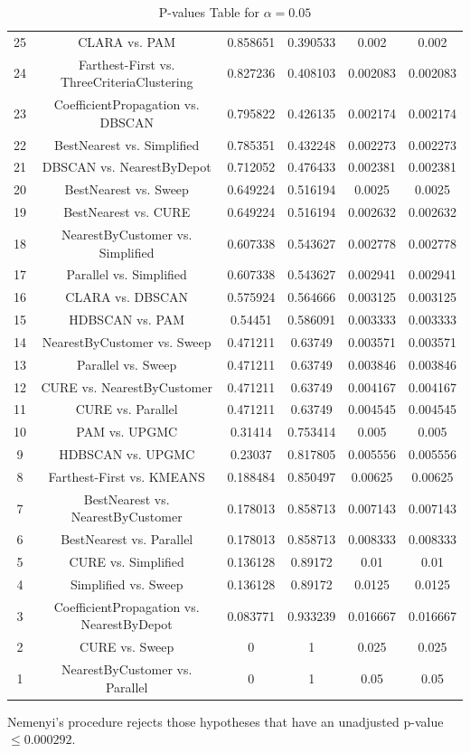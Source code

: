 \documentclass[a4paper,10pt]{article}
\begin{document}
\begin{landscape}
\begin{table}[!htp]
\begin{tabular}{cccccc}
25&CLARA vs. PAM&0.858651&0.390533&0.002&0.002\\
24&Farthest-First vs. ThreeCriteriaClustering&0.827236&0.408103&0.002083&0.002083\\
23&CoefficientPropagation vs. DBSCAN&0.795822&0.426135&0.002174&0.002174\\
22&BestNearest vs. Simplified&0.785351&0.432248&0.002273&0.002273\\
21&DBSCAN vs. NearestByDepot&0.712052&0.476433&0.002381&0.002381\\
20&BestNearest vs. Sweep&0.649224&0.516194&0.0025&0.0025\\
19&BestNearest vs. CURE&0.649224&0.516194&0.002632&0.002632\\
18&NearestByCustomer vs. Simplified&0.607338&0.543627&0.002778&0.002778\\
17&Parallel vs. Simplified&0.607338&0.543627&0.002941&0.002941\\
16&CLARA vs. DBSCAN&0.575924&0.564666&0.003125&0.003125\\
15&HDBSCAN vs. PAM&0.54451&0.586091&0.003333&0.003333\\
14&NearestByCustomer vs. Sweep&0.471211&0.63749&0.003571&0.003571\\
13&Parallel vs. Sweep&0.471211&0.63749&0.003846&0.003846\\
12&CURE vs. NearestByCustomer&0.471211&0.63749&0.004167&0.004167\\
11&CURE vs. Parallel&0.471211&0.63749&0.004545&0.004545\\
10&PAM vs. UPGMC&0.31414&0.753414&0.005&0.005\\
9&HDBSCAN vs. UPGMC&0.23037&0.817805&0.005556&0.005556\\
8&Farthest-First vs. KMEANS&0.188484&0.850497&0.00625&0.00625\\
7&BestNearest vs. NearestByCustomer&0.178013&0.858713&0.007143&0.007143\\
6&BestNearest vs. Parallel&0.178013&0.858713&0.008333&0.008333\\
5&CURE vs. Simplified&0.136128&0.89172&0.01&0.01\\
4&Simplified vs. Sweep&0.136128&0.89172&0.0125&0.0125\\
3&CoefficientPropagation vs. NearestByDepot&0.083771&0.933239&0.016667&0.016667\\
2&CURE vs. Sweep&0&1&0.025&0.025\\
1&NearestByCustomer vs. Parallel&0&1&0.05&0.05\\
\hline
\end{tabular}
\caption{P-values Table for $\alpha=0.05$}
\end{table}Nemenyi's procedure rejects those hypotheses that have an unadjusted p-value $\le0.000292$.


\end{landscape}
\end{document}
